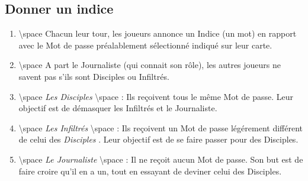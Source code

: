 \documentclass{article}%
\begin{document}
\subsection{ Donner un indice
}%
\label{subsec:Donnerunindice}%
\begin{enumerate}%
\item%
%
\textbackslash{}space%
 Chacun leur tour, les joueurs annonce un Indice (un mot) en rapport avec le Mot de passe préalablement sélectionné indiqué sur leur carte.
%
\item%
%
\textbackslash{}space%
 A part le Journaliste (qui connait son rôle), les autres joueurs ne savent pas s'ils sont Disciples ou Infiltrés.
%
\item%
%
\textbackslash{}space%
\textit{Les Disciples}%
\textbackslash{}space%
 : Ils reçoivent tous le même Mot de passe. Leur objectif est de démasquer les Infiltrés et le Journaliste.
%
\item%
%
\textbackslash{}space%
\textit{Les Infiltrés}%
\textbackslash{}space%
 : Ils reçoivent un Mot de passe légérement différent de celui des %
\textit{Disciples}%
. Leur objectif est de se faire passer pour des Disciples.
%
\item%
%
\textbackslash{}space%
\textit{Le Journaliste}%
\textbackslash{}space%
 : Il ne reçoit aucun Mot de passe. Son but est de faire croire qu'il en a un, tout en essayant de deviner celui des Disciples.
%
\end{enumerate}

%
\end{document}
